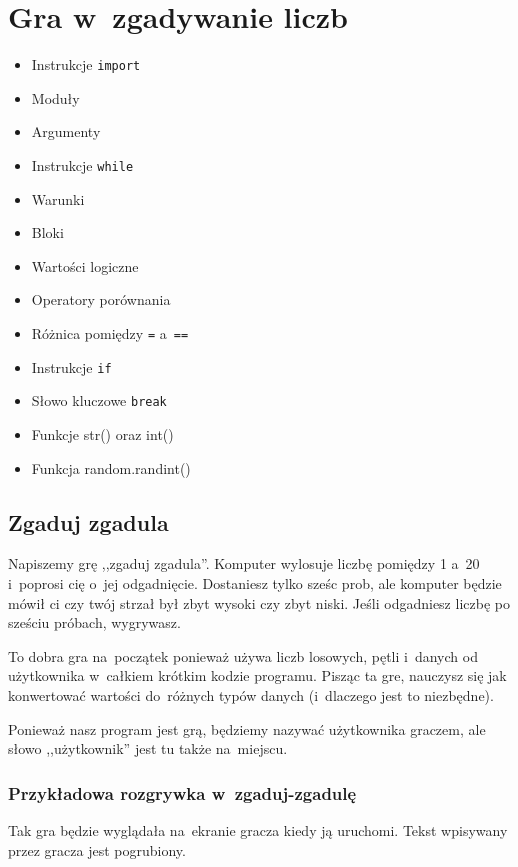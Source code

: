 \documentclass{book}
\newcommand{\btopicscovered}{
	\begin{graybox}
	\begin{itemize}
}
\newcommand{\etopicscovered}{
	\end{itemize}
	\end{graybox}
}
\begin{document}
\chapter{Gra w~zgadywanie liczb}

\btopicscovered
	\item Instrukcje \lstinline{import}
	\item Moduły
	\item Argumenty
	\item Instrukcje \lstinline{while}
	\item Warunki
	\item Bloki
	\item Wartości logiczne
	\item Operatory porównania
	\item Różnica pomiędzy \lstinline{=} a~\lstinline{==}
	\item Instrukcje \lstinline{if}
	\item Słowo kluczowe \lstinline{break}
	\item Funkcje str() oraz int()
	\item Funkcja random.randint()
\etopicscovered

\section{Zgaduj zgadula}

Napiszemy grę ,,zgaduj zgadula''. Komputer wylosuje liczbę pomiędzy 1 a~20 i~poprosi cię o~jej odgadnięcie. Dostaniesz tylko sześc prob, ale komputer będzie mówił ci czy twój strzał był zbyt wysoki czy zbyt niski. Jeśli odgadniesz liczbę po sześciu próbach, wygrywasz.

To dobra gra na~początek ponieważ używa liczb losowych, pętli i~danych od użytkownika w~całkiem krótkim kodzie programu. Pisząc ta gre, nauczysz się jak konwertować wartości do~różnych typów danych (i~dlaczego jest to niezbędne).

Ponieważ nasz program jest grą, będziemy nazywać użytkownika graczem, ale słowo ,,użytkownik'' jest tu także na~miejscu.

\subsection{Przykładowa rozgrywka w~zgaduj-zgadulę}

Tak gra będzie wyglądała na~ekranie gracza kiedy ją uruchomi. Tekst wpisywany przez gracza jest pogrubiony.
\end{document}
